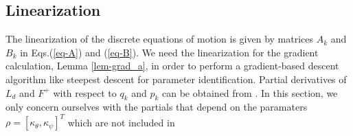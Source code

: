 \documentclass[letterpaper, 10pt, conference]{ieeeconf}
\begin{document}
\subsection{Linearization}
The linearization of the discrete equations of motion is given by matrices $A_k$ and $B_k$ in Eqs.(\ref{eq-A}) and (\ref{eq-B}).  We need the linearization for the gradient calculation, Lemma \ref{lem-grad_a}, in order to perform a gradient-based descent algorithm like steepest descent for parameter identification.  Partial derivatives of $L_d$ and $F^+$ with respect to $q_k$ and $p_k$ can be obtained from \cite{johnson_murphey_linearization}.  In this section, we only concern ourselves with the partials that depend on the paramaters $\rho = [\kappa_\theta,\kappa_\psi]^T$ which are not included in \cite{johnson_murphey_linearization}
\end{document}
